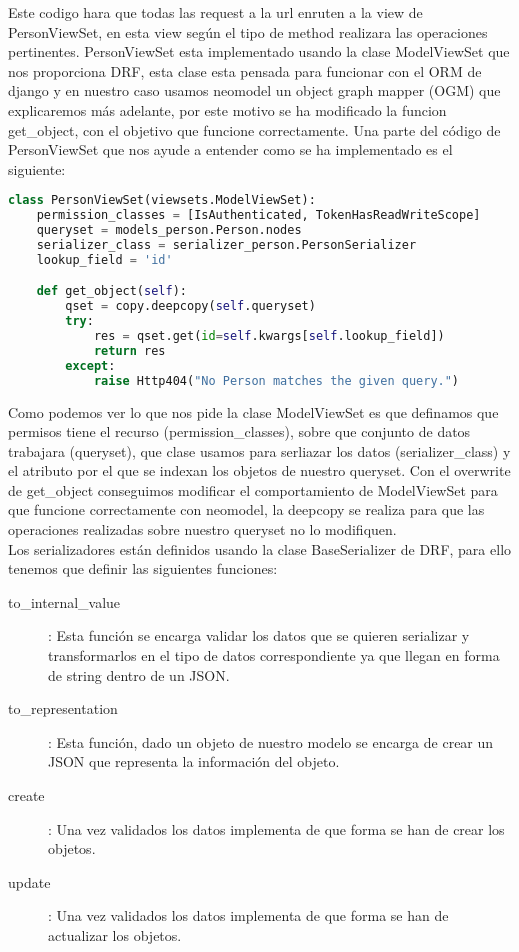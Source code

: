 Este codigo hara que todas las request a la url 
enruten a la view de PersonViewSet, en esta view según el tipo de method realizara las operaciones pertinentes. PersonViewSet esta implementado usando la clase ModelViewSet que nos proporciona DRF, esta clase esta pensada para funcionar con el ORM de django y en nuestro caso usamos neomodel un object graph mapper (OGM) que explicaremos más adelante, por este motivo se ha modificado la funcion get\_object, con el objetivo que funcione correctamente. Una parte del código de PersonViewSet que nos ayude a entender como se ha implementado es el siguiente:
\begin{lstlisting}[language=python]
class PersonViewSet(viewsets.ModelViewSet):
    permission_classes = [IsAuthenticated, TokenHasReadWriteScope]
    queryset = models_person.Person.nodes
    serializer_class = serializer_person.PersonSerializer
    lookup_field = 'id'

    def get_object(self):
        qset = copy.deepcopy(self.queryset)
        try:
            res = qset.get(id=self.kwargs[self.lookup_field])
            return res
        except:
            raise Http404("No Person matches the given query.")
\end{lstlisting}
Como podemos ver lo que nos pide la clase ModelViewSet es que definamos que permisos tiene el recurso (permission\_classes), sobre que conjunto de datos trabajara (queryset), que clase usamos para serliazar los datos (serializer\_class) y el atributo por el que se indexan los objetos de nuestro queryset. Con el overwrite de get\_object conseguimos modificar el comportamiento de ModelViewSet para que funcione correctamente con neomodel, la deepcopy se realiza para que las operaciones realizadas sobre nuestro queryset no lo modifiquen.
\\
Los serializadores están definidos usando la clase BaseSerializer de DRF, para ello tenemos que definir las siguientes funciones:
\begin{description}
\item[to\_internal\_value]: Esta función se encarga validar los datos que se quieren serializar y transformarlos en el tipo de datos correspondiente ya que llegan en forma de string dentro de un JSON.
\item[to\_representation]: Esta función, dado un objeto de nuestro modelo se encarga de crear un JSON que representa la información del objeto.
\item[create]: Una vez validados los datos implementa de que forma se han de crear los objetos.
\item[update]: Una vez validados los datos implementa de que forma se han de actualizar los objetos.
\end{description}

